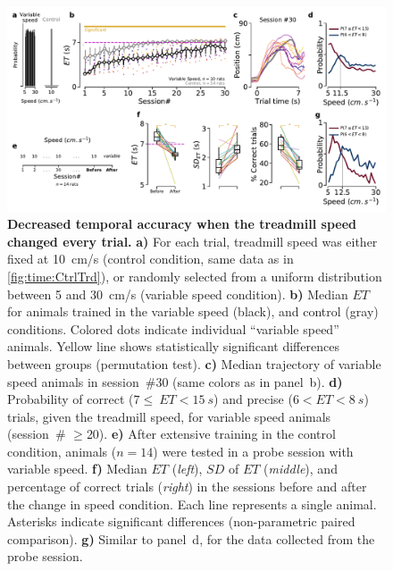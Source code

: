 \begin{figure}[bt!]
  \begin{center}
    \includegraphics[width=\textwidth]{ch-time/figures/VarTrd.pdf}
    \caption[Variable Speed Condition]
    {\textbf{Decreased temporal accuracy when the treadmill speed changed every trial.}
    \textbf{a)}
    For each trial, treadmill speed was either fixed at 10~cm/s (control condition, same data as in \autoref{fig:time:CtrlTrd}), or randomly selected from a uniform distribution between 5 and 30~cm/s (variable speed condition).
    \textbf{b)}
    Median $ET$ for animals trained in the variable speed (black), and control (gray) conditions.
    Colored dots indicate individual ``variable speed'' animals.
    Yellow line shows statistically significant differences between groups (permutation test).
    \textbf{c)}
    Median trajectory of variable speed animals in session~\#30 (same colors as in panel~b).
    \textbf{d)}
    Probability of correct ($7\leq~ET<15~s$) and precise ($6<ET<8~s$) trials, given the treadmill speed, for variable speed animals (session~\# $\geq$20).
    \textbf{e)}
    After extensive training in the control condition, animals ($n=14$) were tested in a probe session with variable speed.
    \textbf{f)}
    Median $ET$ (\textit{left}), $SD$ of $ET$ (\textit{middle}), and percentage of correct trials (\textit{right}) in the sessions before and after the change in speed condition.
    Each line represents a single animal.
    Asterisks indicate significant differences (non-parametric paired comparison).
    \textbf{g)}
    Similar to panel~d, for the data collected from the probe session.
  }
  \label{fig:time:varTrd}
  \end{center}
\end{figure}